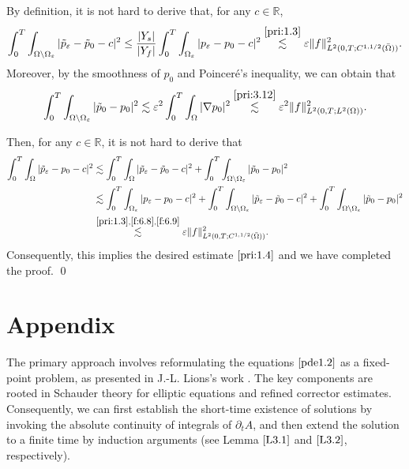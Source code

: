 \documentclass[13pt,CJK]{article}
\theoremstyle{plain}                       %
\theoremstyle{remark}
\numberwithin{equation}{section}
\begin{document}
By definition, it is not hard to derive that, for any $c\in\mathbb{R}$,
\begin{equation}\label{f:6.8}
\int_{0}^{T}\int_{\Omega\setminus\Omega_\varepsilon}
|\tilde{p}_\varepsilon - \tilde{p}_0-c|^2
\leq \frac{|Y_s|}{|Y_f|}\int_{0}^{T}\int_{\Omega_\varepsilon}|p_\varepsilon-p_0-c|^2
\overset{\eqref{pri:1.3}}{\lesssim}\varepsilon
\|f\|_{L^2(0,T;C^{1,1/2}(\bar\Omega))}^2.
\end{equation}
Moreover, by the smoothness of $p_0$ and Poincer\'e's inequality, we can obtain that
\begin{equation}\label{f:6.9}
\int_{0}^{T}
\int_{\Omega\setminus\Omega_\varepsilon}
|\tilde{p}_0 - p_0|^2
\lesssim \varepsilon^2\int_{0}^{T}\int_{\Omega}|\nabla p_0|^2
\overset{\eqref{pri:3.12}}{\lesssim}
\varepsilon^2\|f\|_{L^2(0,T;L^{2}(\Omega))}^2.
\end{equation}

Then, for any $c\in\mathbb{R}$, it is not hard to derive that
\begin{equation*}
\begin{aligned}
\int_{0}^{T}\int_{\Omega}|\tilde{p}_\varepsilon - p_0 - c|^2
&\lesssim \int_{0}^{T}\int_{\Omega}|\tilde{p}_\varepsilon - \tilde{p}_0 - c|^2
+ \int_{0}^{T}\int_{\Omega\setminus\Omega_\varepsilon}|\tilde{p}_0-p_0|^2 \\
&\lesssim
\int_{0}^{T}\int_{\Omega_\varepsilon}|p_\varepsilon - p_0 - c|^2
+ \int_{0}^{T}\int_{\Omega\setminus\Omega_\varepsilon}|\tilde{p}_\varepsilon - \tilde{p}_0-c|^2
+ \int_{0}^{T}\int_{\Omega\setminus\Omega_\varepsilon}|\tilde{p}_0-p_0|^2\\
&\overset{\eqref{pri:1.3},\eqref{f:6.8},\eqref{f:6.9}}{\lesssim}
\varepsilon \|f\|_{L^2(0,T;C^{1,1/2}(\bar\Omega))}^2.
\end{aligned}
\end{equation*}
Consequently, this implies the desired estimate $\eqref{pri:1.4}$ and
we have completed the proof.
\qed







\section{Appendix}\label{sec3*}

\noindent
The primary approach involves reformulating
the equations $\eqref{pde1.2}$ as a fixed-point problem, as presented in J.-L. Lions's work
\cite[pp.170]{Lions81}.
The key components are rooted in Schauder theory for elliptic
equations and refined corrector estimates.
Consequently, we can first establish
the short-time existence of solutions
by invoking the absolute continuity of integrals of
$\partial_t A$, and then extend the solution to
a finite time by induction arguments (see Lemma $\ref{L3.1}$ and $\ref{L3.2}$, respectively).
\end{document}
